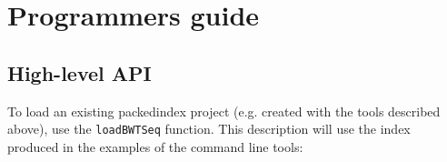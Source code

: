 \documentclass[12pt,titlepage]{article}
\begin{document}
\section{Programmers guide}
\label{sec:packedindex:progguide}

\subsection{High-level API}
\label{sec:packedindex:proguide:highlvl}

\newcommand{\funcName}[1]{\texttt{#1}}
\lstset{language=C,frame=single,}%

To load an existing packedindex project (e.g. created with the tools
described above), use the \funcName{loadBWTSeq} function. This
description will use the  index produced in the
examples of the command line tools:



\end{document}
